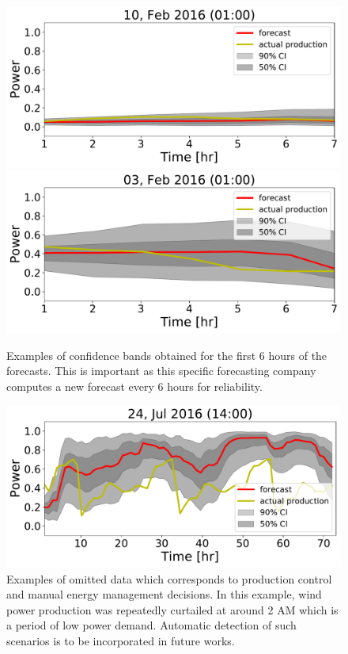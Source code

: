 \documentclass[ima, 20pt, portrait, plainboxedsections]{sciposter}
\begin{document}
\begin{multicols}{3}
\begin{figure}[t]
\begin{center}
   \includegraphics[width=0.8\linewidth]{6hr_forecast_CI_75.pdf}  %
   \includegraphics[width=0.8\linewidth]{6hr_forecast_CI_59.pdf}
\end{center}
   \caption{ Examples of confidence bands obtained for the first 6 hours of the forecasts. This is important as this specific forecasting company computes a new forecast every 6 hours for reliability.}
\label{fig:6hr}
\end{figure}
 
 
 \begin{figure}[t]
\begin{center}
   \includegraphics[width=0.8\linewidth]{72hr_forecast_CI_623.pdf}  %
\end{center}
   \caption{ Examples of omitted data which corresponds to production control and manual energy management decisions. In this example,  wind power production was repeatedly curtailed at around 2 AM which is a period of low power demand. Automatic detection of such scenarios is to be incorporated in future works.}
\label{fig:6hr}
\end{figure}


\end{multicols}
\end{document}
